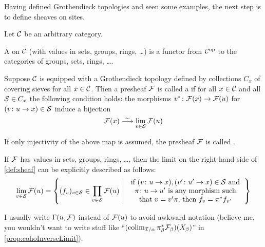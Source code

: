 Having defined Grothendieck topologies and seen some examples, the next step is to define sheaves on sites.
\begin{defi}\label{def:sheaf}
	Let $\mathcal{C}$ be an arbitrary category.
	\begin{alphanumerate}
		\item A  on $\mathcal{C}$ (with values in sets, groups, rings, \ldots) is a functor from $\mathcal{C}^{\mathrm{op}}$ to the categories of groups, sets, rings, \ldots.
		\item Suppose $\mathcal{C}$ is equipped with a Grothendieck topology defined by collections $C_x$ of covering sieves for all $x\in \mathcal{C}$. Then a presheaf $\mathcal{F}$ is called a  if for all $x\in \mathcal{C}$ and all $\mathcal{S}\in C_x$ the following condition holds: the morphisms $v^*\colon \Ff(x)\morphism\Ff(u)$ for $(v\colon u\morphism x)\in\Ss$ induce a bijection
		\begin{equation*}
			\Ff(x)\isomorphism \limit_{v\in\Ss}\Ff(u)
		\end{equation*}
	\end{alphanumerate}
\end{defi}
\begin{rem}
	\begin{alphanumerate}
		\item If only injectivity of the above map is assumed, the presheaf $\mathcal{F}$ is called \defemph{separated}.
		\item If $\mathcal{F}$ has values in sets, groups, rings, \ldots, then the limit on the right-hand side of \cref{def:sheaf} can be explicitly described as follows:
		\begin{equation*}
			\limit_{v\in \Ss}\Ff(u)=\left\{(f_v)_{v\in \Ss}\in\prod_{v\in\Ss}\Ff(u)\st \begin{tabular}{c}
				if $(v\colon u\rightarrow x),(v'\colon u'\rightarrow x)\in\Ss$ and\\
				 $\pi\colon u\rightarrow u'$
				 is any morphism such\\
				 that $v=v'\pi$, then $f_v=\pi^*f_{v'}$
			\end{tabular}\right\}
		\end{equation*}
		\item I usually write $\operatorname{\Gamma}(u,\mathcal{F})$ instead of $\mathcal{F}(u)$ to avoid awkward notation (believe me, you wouldn't want to write stuff like \enquote{$(\operatorname*{colim}_{\mathcal{I}/\alpha}\pi_\beta^*\mathcal{F}_\beta)(X_\beta)$} in \cref{prop:cohoInverseLimit}).
	\end{alphanumerate}
\end{rem}
